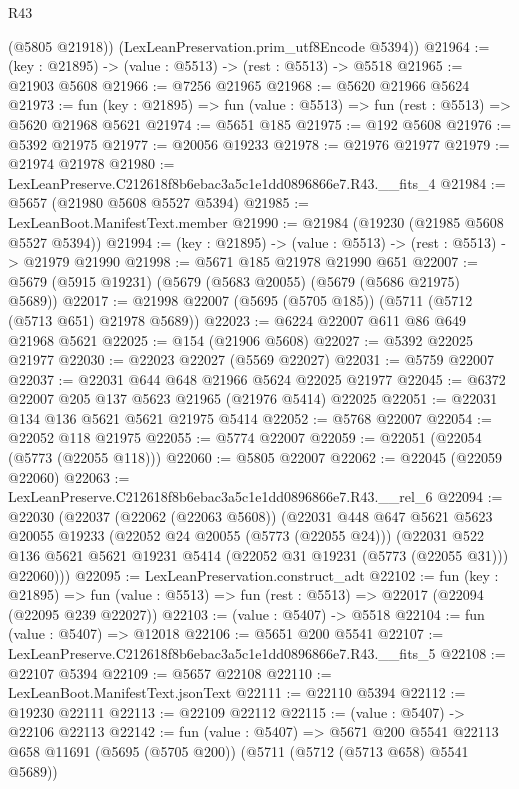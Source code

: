 \begin{lexlean}{R43}
\begin{coremodule}
        (@5805 @21918))
      (LexLeanPreservation.prim_utf8Encode @5394))
@21964 := (key : @21895) -> (value : @5513) -> (rest : @5513) -> @5518
@21965 := @21903 @5608
@21966 := @7256 @21965
@21968 := @5620 @21966 @5624
@21973 := fun (key : @21895) => fun (value : @5513) => fun (rest : @5513) => @5620 @21968 @5621
@21974 := @5651 @185
@21975 := @192 @5608
@21976 := @5392 @21975
@21977 := @20056 @19233
@21978 := @21976 @21977
@21979 := @21974 @21978
@21980 := LexLeanPreserve.C212618f8b6ebac3a5c1e1dd0896866e7.R43.__fits_4
@21984 := @5657 (@21980 @5608 @5527 @5394)
@21985 := LexLeanBoot.ManifestText.member
@21990 := @21984 (@19230 (@21985 @5608 @5527 @5394))
@21994 := (key : @21895) -> (value : @5513) -> (rest : @5513) -> @21979 @21990
@21998 := @5671 @185 @21978 @21990 @651
@22007 := @5679 (@5915 @19231) (@5679 (@5683 @20055) (@5679 (@5686 @21975) @5689))
@22017 := @21998 @22007 (@5695 (@5705 @185)) (@5711 (@5712 (@5713 @651) @21978 @5689))
@22023 := @6224 @22007 @611 @86 @649 @21968 @5621
@22025 := @154 (@21906 @5608)
@22027 := @5392 @22025 @21977
@22030 := @22023 @22027 (@5569 @22027)
@22031 := @5759 @22007
@22037 := @22031 @644 @648 @21966 @5624 @22025 @21977
@22045 := @6372 @22007 @205 @137 @5623 @21965 (@21976 @5414) @22025
@22051 := @22031 @134 @136 @5621 @5621 @21975 @5414
@22052 := @5768 @22007
@22054 := @22052 @118 @21975
@22055 := @5774 @22007
@22059 := @22051 (@22054 (@5773 (@22055 @118)))
@22060 := @5805 @22007
@22062 := @22045 (@22059 @22060)
@22063 := LexLeanPreserve.C212618f8b6ebac3a5c1e1dd0896866e7.R43.__rel_6
@22094 := @22030
    (@22037
      (@22062 (@22063 @5608))
      (@22031
        @448
        @647
        @5621
        @5623
        @20055
        @19233
        (@22052 @24 @20055 (@5773 (@22055 @24)))
        (@22031
          @522
          @136
          @5621
          @5621
          @19231
          @5414
          (@22052 @31 @19231 (@5773 (@22055 @31)))
          @22060)))
@22095 := LexLeanPreservation.construct_adt
@22102 := fun (key : @21895) =>
  fun (value : @5513) => fun (rest : @5513) => @22017 (@22094 (@22095 @239 @22027))
@22103 := (value : @5407) -> @5518
@22104 := fun (value : @5407) => @12018
@22106 := @5651 @200 @5541
@22107 := LexLeanPreserve.C212618f8b6ebac3a5c1e1dd0896866e7.R43.__fits_5
@22108 := @22107 @5394
@22109 := @5657 @22108
@22110 := LexLeanBoot.ManifestText.jsonText
@22111 := @22110 @5394
@22112 := @19230 @22111
@22113 := @22109 @22112
@22115 := (value : @5407) -> @22106 @22113
@22142 := fun (value : @5407) =>
  @5671
    @200
    @5541
    @22113
    @658
    @11691
    (@5695 (@5705 @200))
    (@5711 (@5712 (@5713 @658) @5541 @5689))

\end{coremodule}
\end{lexlean}
